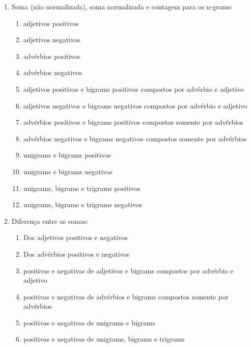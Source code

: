 \documentclass[template.tex]{subfiles}
\begin{document}
\begin{enumerate}
  \item Soma (não normalizada), soma normalizada e contagem para os n-grams:
  \begin{enumerate}
     \item adjetivos positivos
     \item adjetivos negativos
     \item advérbios positivos
     \item advérbios negativos
     
     
     \item adjetivos positivos e bigrams positivos compostos por advérbio e adjetivo
     \item adjetivos negativos e bigrams negativos compostos por advérbio e adjetivo
     \item advérbios positivos e bigrams positivos compostos somente por advérbios
	 \item advérbios negativos e bigrams negativos compostos somente por advérbios
	 \item unigrams e bigrams positivos
	 \item unigrams e bigrams negativos
	 \item unigrams, bigrams e trigrams positivos 
	 \item unigrams, bigrams e trigrams negativos
  \end{enumerate}
  \item Diferença entre as somas: 
  
  \begin{enumerate}
     \item Dos adjetivos positivos e negativos
     \item Dos advérbios positivos e negativos
     \item positivas e negativas de adjetivos e bigrams compostos por advérbio e adjetivo
     \item positivas e negativas de advérbios e bigrams compostos somente por advérbios
     \item positivas e negativas de unigrams e bigrams
     \item positivas e negativas de unigrams, bigrams e trigrams
  \end{enumerate}
  

\end{enumerate}
\end{document}
